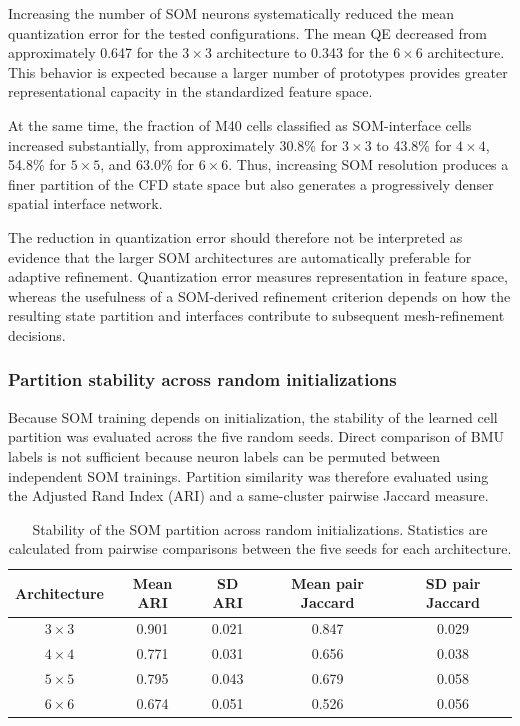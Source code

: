 Increasing the number of SOM neurons systematically reduced the mean
quantization error for the tested configurations. The mean QE decreased from
approximately 0.647 for the \(3\times3\) architecture to 0.343 for the
\(6\times6\) architecture. This behavior is expected because a larger number
of prototypes provides greater representational capacity in the standardized
feature space.

At the same time, the fraction of M40 cells classified as SOM-interface cells
increased substantially, from approximately 30.8\% for \(3\times3\) to
43.8\% for \(4\times4\), 54.8\% for \(5\times5\), and 63.0\% for
\(6\times6\). Thus, increasing SOM resolution produces a finer partition of
the CFD state space but also generates a progressively denser spatial
interface network.

The reduction in quantization error should therefore not be interpreted as
evidence that the larger SOM architectures are automatically preferable for
adaptive refinement. Quantization error measures representation in feature
space, whereas the usefulness of a SOM-derived refinement criterion depends
on how the resulting state partition and interfaces contribute to subsequent
mesh-refinement decisions.

\subsubsection{Partition stability across random initializations}

Because SOM training depends on initialization, the stability of the learned
cell partition was evaluated across the five random seeds. Direct comparison
of BMU labels is not sufficient because neuron labels can be permuted between
independent SOM trainings. Partition similarity was therefore evaluated using
the Adjusted Rand Index (ARI) and a same-cluster pairwise Jaccard measure.

\begin{table}[htbp]
\centering
\caption{Stability of the SOM partition across random initializations.
Statistics are calculated from pairwise comparisons between the five seeds
for each architecture.}
\label{tab:som_partition_stability}
\begin{tabular}{ccccc}
\hline
Architecture & Mean ARI & SD ARI & Mean pair Jaccard & SD pair Jaccard \\
\hline
\(3\times3\) & 0.901 & 0.021 & 0.847 & 0.029 \\
\(4\times4\) & 0.771 & 0.031 & 0.656 & 0.038 \\
\(5\times5\) & 0.795 & 0.043 & 0.679 & 0.058 \\
\(6\times6\) & 0.674 & 0.051 & 0.526 & 0.056 \\
\hline
\end{tabular}
\end{table}


